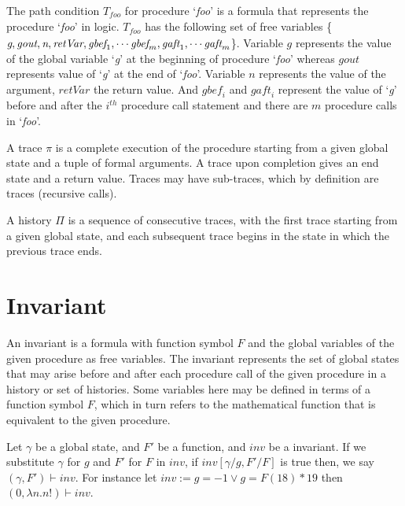 \documentclass{llncs}
\newcommand{\foo}{\textit{foo}}
\newcommand{\trace}{\pi}
\newcommand{\inv}{\mathit{inv}}
\newcommand{\history}{\Pi}
\newcommand{\pathCondition}{\mathit{T_{\foo}}}
\newcommand{\retVar}{\textit{retVar}}
\newcommand{\F}{\mathit{F}}
\newcommand{\n}{\textit{n}}
\newcommand{\gstate}{\gamma}
\newcommand{\g}{\textit{g}}
\newcommand{\gout}{\textit{gout}}
\newcommand{\gbef}{\textit{gbef}}
\newcommand{\gaft}{\textit{gaft}}
\newcommand{\satisfies}{\vdash}
\begin{document}
  The path condition $\pathCondition$ for procedure `\foo' is a
  formula that represents the procedure `\foo' in logic.
  $\pathCondition$ has the following set of free variables \{$\g,
  \gout,\n,\\ \retVar, \gbef_1, \cdots \gbef_m, \gaft_1, \cdots
  \gaft_m$\}. Variable $\g$ represents the value of the global
  variable `\g' at the beginning of procedure `\foo' whereas $\gout$
  represents value of `\g' at the end of `\foo'. Variable $\n$
  represents the value of the argument, $\retVar$ the return
  value. And $\gbef_i$ and $\gaft_i$ represent the value of `\g' before
  and after the $i^{th}$ procedure call statement and there are $m$
  procedure calls in `\foo'.

\begin{definition}[trace]
  A trace $\trace$ is a complete execution of the procedure starting
  from a given global state and a tuple of formal arguments. A trace
  upon completion gives an end state and a return value. Traces may
  have sub-traces, which by definition are traces (recursive calls).
\end{definition}

\begin{definition}[history]
  A history $\history$ is a sequence of consecutive traces, with the
  first trace starting from a given global state, and each subsequent
  trace begins in the state in which the previous trace ends.
\end{definition}

\section{Invariant}

\begin{definition}[invariant]
  An invariant is a formula with function symbol $\F$ and the global
  variables of the given procedure as free variables. The invariant
  represents the set of global states that may arise before and after
  each procedure call of the given procedure in a history or set of
  histories. Some variables here may be defined in terms of a function
  symbol $\F$, which in turn refers to the mathematical function that
  is equivalent to the given procedure.
  
  Let $\gstate$ be a global state, and $\F'$ be a function, and $\inv$
  be a invariant. If we substitute $\gstate$ for $g$ and $\F'$ for
  $\F$ in $\inv$, if $\inv[\gstate/g, \F'/\F]$ is true then, we say
  $(\gstate, \F') \satisfies \inv$. For instance let $\inv := g = -1
  \vee g = \F(18) * 19$ then $(0, \lambda n. n!) \satisfies \inv$.
\end{definition}
\end{document}
